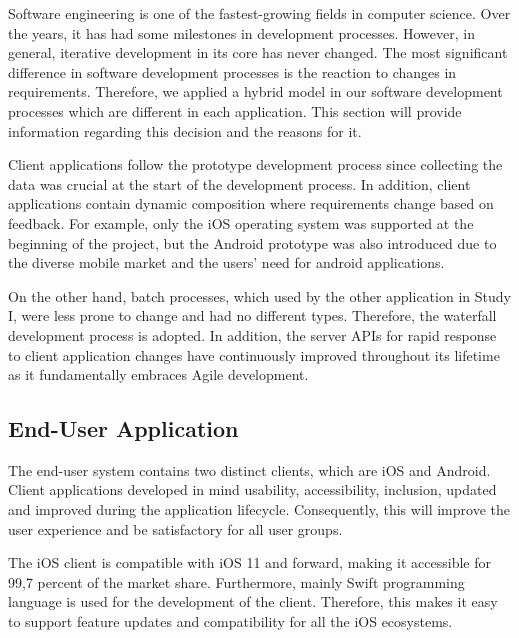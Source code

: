 Software engineering is one of the fastest-growing fields in computer science. Over the years, it has had some milestones in development processes. However, in general, iterative development in its core has never changed. The most significant difference in software development processes is the reaction to changes in requirements. Therefore, we applied a hybrid model in our software development processes which are different in each application. This section will provide information regarding this decision and the reasons for it.

Client applications follow the prototype development process since collecting the data was crucial at the start of the development process. In addition, client applications contain dynamic composition where requirements change based on feedback. For example, only the iOS operating system was supported at the beginning of the project, but the Android prototype was also introduced due to the diverse mobile market and the users' need for android applications.

On the other hand, batch processes, which used by the other application in Study I, were less prone to change and had no different types. Therefore, the waterfall development process is adopted. In addition, the server APIs for rapid response to client application changes have continuously improved throughout its lifetime as it fundamentally embraces Agile development.

\subsection{End-User Application}

The end-user system contains two distinct clients, which are iOS and Android. Client applications developed in mind usability, accessibility, inclusion, updated and improved during the application lifecycle. Consequently, this will improve the user experience and be satisfactory for all user groups.

The iOS client is compatible with iOS 11 and forward, making it accessible for 99,7 percent of the market share. Furthermore, mainly Swift programming language is used for the development of the client. Therefore, this makes it easy to support feature updates and compatibility for all the iOS ecosystems. 

